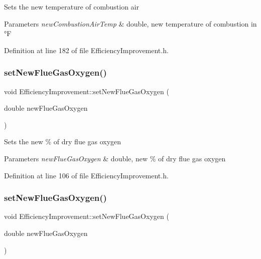 Sets the new temperature of combustion air


\begin{DoxyParams}{Parameters}
{\em new\+Combustion\+Air\+Temp} & double, new temperature of combustion in °F \\
\hline
\end{DoxyParams}


Definition at line 182 of file Efficiency\+Improvement.\+h.

\mbox{\label{class_efficiency_improvement_a111f7e30d302b4e71103a2ec6d199e2c}} 
\subsubsection{\texorpdfstring{set\+New\+Flue\+Gas\+Oxygen()}{setNewFlueGasOxygen()}\hspace{0.1cm}{\footnotesize\ttfamily [1/3]}}
{\footnotesize\ttfamily void Efficiency\+Improvement\+::set\+New\+Flue\+Gas\+Oxygen (\begin{DoxyParamCaption}\item[{double}]{new\+Flue\+Gas\+Oxygen }\end{DoxyParamCaption})\hspace{0.3cm}{\ttfamily [inline]}}

Sets the new \% of dry flue gas oxygen


\begin{DoxyParams}{Parameters}
{\em new\+Flue\+Gas\+Oxygen} & double, new \% of dry flue gas oxygen \\
\hline
\end{DoxyParams}


Definition at line 106 of file Efficiency\+Improvement.\+h.

\mbox{\label{class_efficiency_improvement_a111f7e30d302b4e71103a2ec6d199e2c}} 
\subsubsection{\texorpdfstring{set\+New\+Flue\+Gas\+Oxygen()}{setNewFlueGasOxygen()}\hspace{0.1cm}{\footnotesize\ttfamily [2/3]}}
{\footnotesize\ttfamily void Efficiency\+Improvement\+::set\+New\+Flue\+Gas\+Oxygen (\begin{DoxyParamCaption}\item[{double}]{new\+Flue\+Gas\+Oxygen }\end{DoxyParamCaption})\hspace{0.3cm}{\ttfamily [inline]}}

